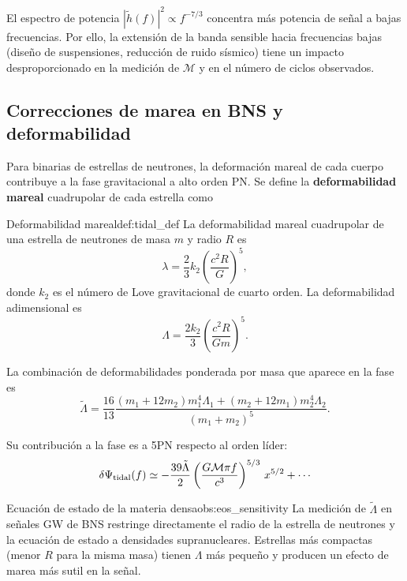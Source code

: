 \begin{importante}
El espectro de potencia $|\tilde{h}(f)|^2 \propto f^{-7/3}$ concentra más potencia de señal a bajas frecuencias. Por ello, la extensión de la banda sensible hacia frecuencias bajas (diseño de suspensiones, reducción de ruido sísmico) tiene un impacto desproporcionado en la medición de $\mathcal{M}$ y en el número de ciclos observados.
\end{importante}

\subsection{Correcciones de marea en BNS y deformabilidad}

Para binarias de estrellas de neutrones, la deformación mareal de cada cuerpo contribuye a la fase gravitacional a alto orden PN. Se define la \textbf{deformabilidad mareal} cuadrupolar de cada estrella como

\begin{definicion}{Deformabilidad mareal}{def:tidal_def}
La deformabilidad mareal cuadrupolar de una estrella de neutrones de masa $m$ y radio $R$ es
\begin{equation}
  \lambda = \frac{2}{3}k_2\left(\frac{c^2 R}{G}\right)^5,
\end{equation}
donde $k_2$ es el número de Love gravitacional de cuarto orden. La deformabilidad adimensional es
\begin{equation}
  \Lambda = \frac{2k_2}{3}\left(\frac{c^2 R}{G m}\right)^5.
\end{equation}
\end{definicion}

La combinación de deformabilidades ponderada por masa que aparece en la fase es
\begin{equation}
  \tilde\Lambda = \frac{16}{13}\frac{(m_1+12m_2)m_1^4\Lambda_1 + (m_2+12m_1)m_2^4\Lambda_2}{(m_1+m_2)^5}.
\end{equation}

Su contribución a la fase es a 5PN respecto al orden líder:
\begin{equation}
  \delta\Psi_{\rm tidal}(f) \simeq
  -\frac{39\tilde\Lambda}{2}
  \left(\frac{G\mathcal{M}\pi f}{c^3}\right)^{5/3}\,x^{5/2} + \cdots
  \label{eq:tidal_phase}
\end{equation}

\begin{observacion}{Ecuación de estado de la materia densa}{obs:eos_sensitivity}
La medición de $\tilde\Lambda$ en señales GW de BNS restringe directamente el radio de la estrella de neutrones y la ecuación de estado a densidades supranucleares. Estrellas más compactas (menor $R$ para la misma masa) tienen $\Lambda$ más pequeño y producen un efecto de marea más sutil en la señal.
\end{observacion}

